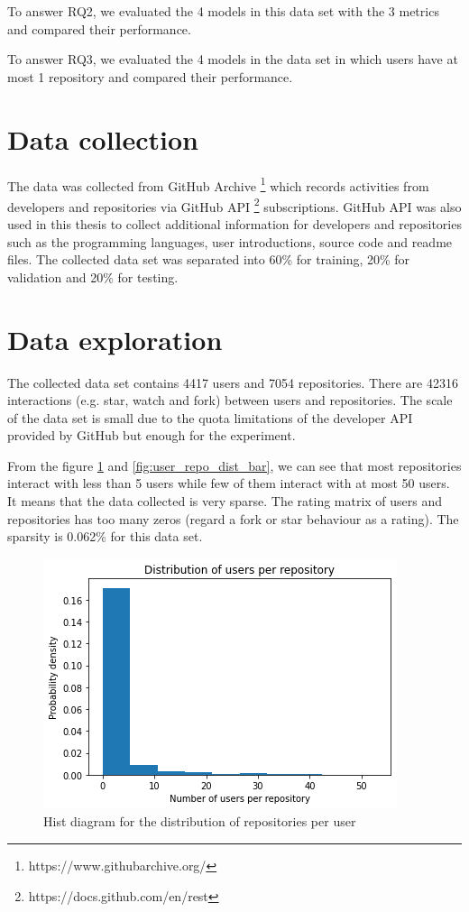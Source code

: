 \documentclass[11pt,twoside]{report}
\begin{document}
To answer RQ2, we evaluated the 4 models in this data set with the 3 metrics and compared their performance.

To answer RQ3, we evaluated the 4 models in the data set in which users have at most 1 repository and compared their performance.

\section{Data collection}
The data was collected from GitHub Archive \footnote{https://www.githubarchive.org/} which records activities from developers and repositories via GitHub API \footnote{https://docs.github.com/en/rest} subscriptions. GitHub API was also used in this thesis to collect additional information for developers and repositories such as the programming languages, user introductions, source code and readme files. The collected data set was separated into 60\% for training, 20\% for validation and 20\% for testing.

\section{Data exploration}
The collected data set contains 4417 users and 7054 repositories. There are 42316 interactions (e.g. star, watch and fork) between users and repositories. The scale of the data set is small due to the quota limitations of the developer API provided by GitHub but enough for the experiment.

From the figure \ref{fig:user_repo_dist_hist} and \ref{fig:user_repo_dist_bar}, we can see that most repositories interact with less than 5 users while few of them interact with at most 50 users. It means that the data collected is very sparse. The rating matrix of users and repositories has too many zeros (regard a fork or star behaviour as a rating). The sparsity is 0.062\% for this data set.

\begin{figure}[H]
    \centering
    \includegraphics[scale=0.9]{user_repo_dist_hist.png}
    \caption{Hist diagram for the distribution of repositories per user}
    \label{fig:user_repo_dist_hist}
\end{figure}
\end{document}
